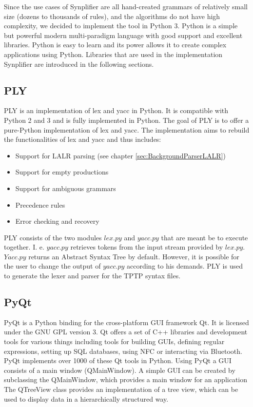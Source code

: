 Since the use cases of \ac{Synplifier} are all hand-created grammars of relatively small size (dozens to thousands of rules), and the algorithms do not have high complexity, we decided to implement the tool in Python 3. 
Python is a simple but powerful modern multi-paradigm language with good support and excellent libraries.
Python is easy to learn and its power allows it to create complex applications using Python.
Libraries that are used in the implementation \ac{Synplifier} are introduced in the following sections.

\subsection{PLY}\label{sec:BackgroundPythonPLY}

\acf{PLY} is an implementation of lex and yacc in Python. It is compatible with Python 2 and 3 and is fully implemented in Python. The goal of \ac{PLY} is to offer a pure-Python implementation of lex and yacc. The implementation aims to rebuild the functionalities of lex and yacc and thus includes:
\begin{itemize}
\item Support for LALR parsing (see chapter \ref{sec:BackgroundParserLALR})
\item Support for empty productions
\item Support for ambiguous grammars 
\item Precedence rules
\item Error checking and recovery
\end{itemize}

\ac{PLY} consists of the two modules $lex.py$ and $yacc.py$ that are meant be to execute together. I. e. $yacc.py$ retrieves tokens from the input stream provided by $lex.py$. $Yacc.py$ returns an Abstract Syntax Tree by default. However, it is possible for the user to change the output of $yacc.py$ according to his demands. \cite{PLY}
PLY is used to generate the lexer and parser for the \ac{TPTP} syntax files.

\subsection{PyQt}\label{sec:BackgroundPytonPyQt}

PyQt is a Python binding for the cross-platform GUI framework Qt.
It is licensed under the GNU GPL version 3.
Qt offers a set of C++ libraries and development tools for various things including tools for building GUIs, defining regular expressions, setting up SQL databases, using NFC or interacting via Bluetooth.
PyQt implements over 1000 of these Qt tools in Python.
Using PyQt a GUI consists of a main window (QMainWindow).
A simple GUI can be created by subclassing the QMainWindow, which provides a main window for an application
The QTreeView class provides an implementation of a tree view, which can be used to display data in a hierarchically structured way. \cite{PyQt}

